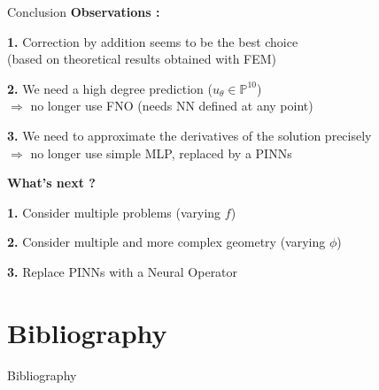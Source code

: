\documentclass[compress,10pt,xcolor={table,dvipsnames},t]{beamer}
\begin{document}
	\begin{frame}[label={lastslide}]{Conclusion}
        \textbf{Observations :}
        
        \textbf{1.} Correction by addition seems to be the best choice \\
        (based on theoretical results obtained with FEM)

        \textbf{2.} We need a high degree prediction ($u_\theta\in\mathbb{P}^{10}$) \\
        $\Rightarrow$ no longer use FNO (needs NN defined at any point)

        \textbf{3.} We need to approximate the derivatives of the solution precisely \\
        $\Rightarrow$ no longer use simple MLP, replaced by a PINNs

        \vspace{15pt}

        \textbf{What's next ?}

        \textbf{1.} Consider multiple problems (varying $f$)

        \textbf{2.} Consider multiple and more complex geometry (varying $\phi$)

        \textbf{3.} Replace PINNs with a Neural Operator
	\end{frame}

	\section{Bibliography}
	
    { 
    \begin{frame}{Bibliography}
		\small
        \printbibliography[heading=none]
	\end{frame}
    }
    \addtocounter{framenumber}{-1} 

    \appendix

    
	
\end{document}
